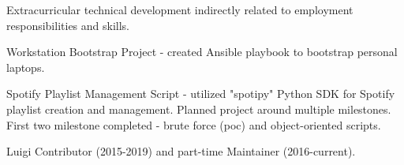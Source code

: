 Extracurricular technical development indirectly related to employment responsibilities and skills.

\begin{zitemize}
    \item Workstation Bootstrap Project - created Ansible playbook to bootstrap personal laptops.
    \item Spotify Playlist Management Script - utilized "spotipy" Python SDK for Spotify playlist creation and management. Planned project around multiple milestones. First two milestone completed - brute force (poc) and object-oriented scripts.
    \item Luigi Contributor (2015-2019) and part-time Maintainer (2016-current).
\end{zitemize}

\vspace{5pt}
